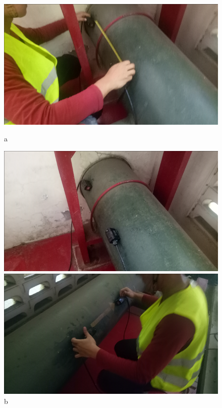 \begin{figure}[ht]
	\begin{minipage}[b]{0.225\linewidth}
		\centering
		\includegraphics[width=\textwidth]{figures/fig_ch02_ufm3}
		\caption*{a}
	\end{minipage}
	\hspace{0.05cm}
	\begin{minipage}[b]{0.225\linewidth}
		\centering
		\includegraphics[width=\textwidth]{figures/fig_ch02_ufm4}
		\caption*{b}
	\end{minipage}
	\hspace{0.05cm}
	\begin{minipage}[b]{0.225\linewidth}
		\centering
		\includegraphics[width=\textwidth]{figures/fig_ch02_ufm1}

\end{minipage}
\end{figure}
